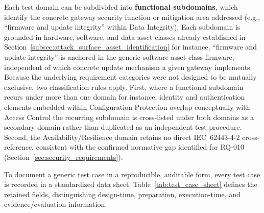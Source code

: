 Each test domain can be subdivided into \textbf{functional subdomains}, which identify the concrete gateway security function or mitigation area addressed (e.g., ``firmware and update integrity'' within Data Integrity). Each subdomain is grounded in hardware, software, and data asset classes already established in Section~\ref{subsec:attack_surface_asset_identification}  for instance, ``firmware and update integrity'' is anchored in the generic software asset class firmware, independent of which concrete update mechanism a given gateway implements. Because the underlying requirement categories were not designed to be mutually exclusive, two classification rules apply. First, where a functional subdomain recurs under more than one domain  for instance, identity and authentication elements embedded within Configuration Protection overlap conceptually with Access Control  the recurring subdomain is cross-listed under both domains as a secondary domain rather than duplicated as an independent test procedure. Second, the Availability/Resilience domain retains no direct IEC~62443-4-2 cross-reference, consistent with the confirmed normative gap identified for RQ-010 (Section~\ref{sec:security_requirements}).



To document a generic test case in a reproducible, auditable form, every test case is recorded in a standardized data sheet. Table~\ref{tab:test_case_sheet} defines the retained fields, distinguishing design-time, preparation, execution-time, and evidence/evaluation information.


